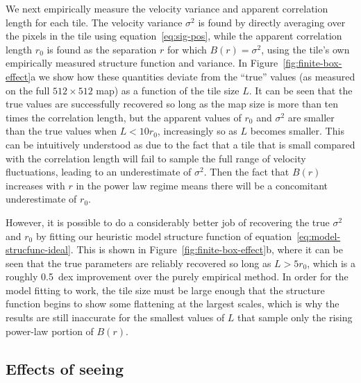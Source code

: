 \documentclass[fleqn,usenatbib, useAMS, a4paper]{mnras}
\newcommand\startNEW{\color{black}}
\newcommand\stopNEW{\color{black}}
\newcommand\NEW[1]{\startNEW #1\stopNEW\relax}
\begin{document}
We next empirically measure the velocity variance and
apparent correlation length for each tile.
The velocity variance \(\sigma^2\) is found by
directly averaging over the pixels in the tile using equation~\eqref{eq:sig-pos},
while the apparent correlation length \(r_0\)
is found as the separation \(r\) for which \(B(r) = \sigma^2\),
using the tile's own empirically measured structure function and variance.
In \NEW{Figure~\ref{fig:finite-box-effect}a} we show how these
quantities deviate from the ``true'' values
(as measured on the full \(512 \times 512\) map)
as a function of the tile size \(L\).
It can be seen that the true values are successfully recovered
so long as the map size is more than ten times the correlation length,
but the apparent values of \(r_0\) and \(\sigma^2\) are smaller than the true values
when \(L < 10 r_0\), increasingly so as \(L\) becomes smaller.
This can be intuitively understood as due to the fact that a tile that
is small compared with the correlation length will
fail to sample the full range of velocity fluctuations,
leading to an underestimate of \(\sigma^2\).
Then the fact that \(B(r)\) increases with \(r\) in the power law regime
means there will be a concomitant underestimate of \(r_0\).

However, it is possible to do a considerably better job
of recovering the true \(\sigma^2\) and \(r_0\) by fitting our
heuristic model structure function of equation~\eqref{eq:model-strucfunc-ideal}.
This is shown in \NEW{Figure~\ref{fig:finite-box-effect}b}, where it can be seen
that the true parameters are reliably recovered so long as \NEW{\(L > 5 r_0\)},
which is a roughly \SI{0.5}{dex} improvement over the purely empirical method.
In order for the model fitting to work, the tile size must be large enough
that the structure function begins to show some flattening at the largest scales,
which is why the results are still inaccurate for the smallest values of \(L\)
that sample only the rising power-law portion of \(B(r)\). 

\startNEW
\subsection{Effects of seeing}
\label{sec:effects-seeing-struc}
\stopNEW
\end{document}
